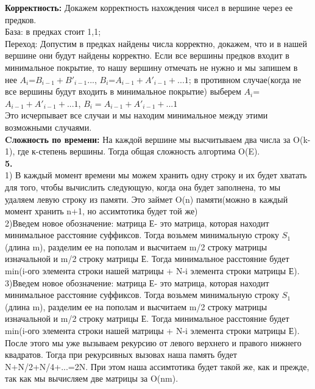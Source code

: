 \documentclass[a4paper,12pt]{article}
\begin{document}
\textbf{Корректность:} Докажем корректность нахождения чисел в вершине через ее предков. \\
База: в предках стоит 1,1;\\
Переход: Допустим в предках найдены числа корректно, докажем, что и в нашей вершине  они будут найдены корректно. Если все вершины предков входит в минимальное покрытие, то нашу вершину отмечать не нужно и мы запишем в нее $A_i$=$B_{i-1}+B'_{i-1}...$, $B_i$=$A_{i-1}+A'_{i-1}+...1$; в противном случае(когда не все вершины будут входить в минимальное покрытие) выберем 
$A_i$=$A_{i-1}+A'_{i-1}+...1$, $B_i=A_{i-1}+A'_{i-1}+...1$\\
Это исчерпывает все случаи и мы находим минимальное между этими возможными случаями.\\
\textbf{Cложность по времени:} На каждой вершине мы высчитываем два числа за O(k-1), где к-степень вершины. Тогда общая сложность алгортима O(E).\\
\textbf{5.}\\
1) В каждый момент времени мы можем хранить одну строку и их будет хватать для того, чтобы вычислить следующую, когда она будет заполнена, то мы удаляем левую строку из памяти. Это займет O(n) памяти(можно в каждый момент хранить n+1, но ассимтотика будет той же)\\
2)Введем новое обозначение: матрица Е- это матрица, которая находит минимальное расстояние суффиксов. Тогда возьмем минимальную строку $S_1$(длина m), разделим ее на пополам и высчитаем m/2 строку матрицы изначальной и m/2 строку матрицы Е. Тогда минимальное расстояние будет min(i-ого элемента строки нашей матрицы + N-i элемента строки матрицы Е).\\
3)Введем новое обозначение: матрица Е- это матрица, которая находит минимальное расстояние суффиксов. Тогда возьмем минимальную строку $S_1$(длина m), разделим ее на пополам и высчитаем m/2 строку матрицы изначальной и m/2 строку матрицы Е. Тогда минимальное расстояние будет min(i-ого элемента строки нашей матрицы + N-i элемента строки матрицы Е). После этого мы уже вызываем рекурсию от левого верхнего и правого нижнего квадратов. Тогда при рекурсивных вызовах наша память будет N+N/2+N/4+...=2N.  При этом наша ассимтотика будет такой же, как и прежде, так как мы вычисляем две матрицы за  O(nm).\\
\end{document}
